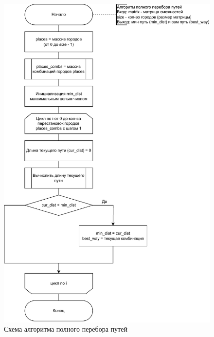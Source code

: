 \begin{figure}[h!]
	\centering
	\includegraphics[width=0.95\linewidth]{img/full}
	\caption{Схема алгоритма полного перебора путей}
	\label{fig:full}
\end{figure}
